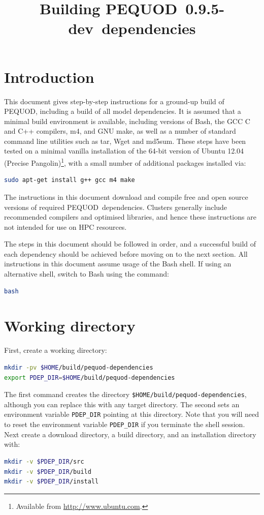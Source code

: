 \documentclass[a4paper]{article}
\newcommand{\pequod}{PEQUOD}
\newcommand{\version}{0.9.5-dev}
\begin{document}
\title{Building \pequod\ \version\ dependencies}
\maketitle

\section{Introduction}

This document gives step-by-step instructions for a ground-up build of \pequod,
including a build of all model dependencies. It is assumed that a minimal build
environment is available, including versions of Bash, the GCC C and C++ compilers, m4,
and GNU make, as well as a number of standard command line utilities such as
tar, Wget and md5sum. These steps have been tested on a minimal vanilla
installation of the 64-bit version of Ubuntu 12.04 (Precise
Pangolin)\footnote{Available from \url{http://www.ubuntu.com}.}, with a small
number of additional packages installed via:
\begin{lstlisting}[language = bash, frame = single]
sudo apt-get install g++ gcc m4 make
\end{lstlisting}

The instructions in this document download and compile free and open source
versions of required \pequod\ dependencies. Clusters generally include
recommended compilers and optimised libraries, and hence these instructions are
not intended for use on HPC resources.

The steps in this document should be followed in order, and a successful build
of each dependency should be achieved before moving on to the next section. All
instructions in this document assume usage of the Bash shell. If using an
alternative shell, switch to Bash using the command:
\begin{lstlisting}[language = sh, frame = single]
bash
\end{lstlisting}

\section{Working directory}\label{sect:dir}

First, create a working directory:
\begin{lstlisting}[language = bash, frame = single]
mkdir -pv $HOME/build/pequod-dependencies
export PDEP_DIR=$HOME/build/pequod-dependencies
\end{lstlisting}
The first command creates the directory \verb+$HOME/build/pequod-dependencies+,
although you can replace this with any target directory. The second sets an
environment variable \verb+PDEP_DIR+ pointing at this directory. Note that you
will need to reset the environment variable \verb+PDEP_DIR+ if you terminate the
shell session. Next create a download directory, a build directory, and an
installation directory with:
\begin{lstlisting}[language = bash, frame = single]
mkdir -v $PDEP_DIR/src
mkdir -v $PDEP_DIR/build
mkdir -v $PDEP_DIR/install
\end{lstlisting}
\end{document}
